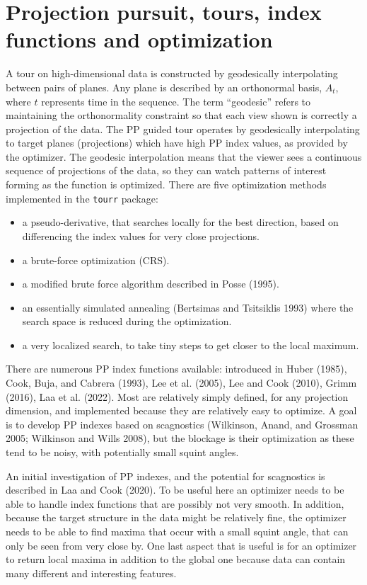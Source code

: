 \documentclass[
  12pt,
]{interact}
\providecommand{\tightlist}{%
  \setlength{\itemsep}{0pt}\setlength{\parskip}{0pt}}
\theoremstyle{plain}
\begin{document}
\section{Projection pursuit, tours, index functions and
optimization}\label{sec-background}

A tour on high-dimensional data is constructed by geodesically
interpolating between pairs of planes. Any plane is described by an
orthonormal basis, \(A_t\), where \(t\) represents time in the sequence.
The term ``geodesic'' refers to maintaining the orthonormality
constraint so that each view shown is correctly a projection of the
data. The PP guided tour operates by geodesically interpolating to
target planes (projections) which have high PP index values, as provided
by the optimizer. The geodesic interpolation means that the viewer sees
a continuous sequence of projections of the data, so they can watch
patterns of interest forming as the function is optimized. There are
five optimization methods implemented in the \texttt{tourr} package:

\begin{itemize}
\tightlist
\item
  a pseudo-derivative, that searches locally for the best direction,
  based on differencing the index values for very close projections.
\item
  a brute-force optimization (CRS).
\item
  a modified brute force algorithm described in Posse (1995).
\item
  an essentially simulated annealing (Bertsimas and Tsitsiklis 1993)
  where the search space is reduced during the optimization.
\item
  a very localized search, to take tiny steps to get closer to the local
  maximum.
\end{itemize}

There are numerous PP index functions available: introduced in Huber
(1985), Cook, Buja, and Cabrera (1993), Lee et al. (2005), Lee and Cook
(2010), Grimm (2016), Laa et al. (2022). Most are relatively simply
defined, for any projection dimension, and implemented because they are
relatively easy to optimize. A goal is to develop PP indexes based on
scagnostics (Wilkinson, Anand, and Grossman 2005; Wilkinson and Wills
2008), but the blockage is their optimization as these tend to be noisy,
with potentially small squint angles.

An initial investigation of PP indexes, and the potential for
scagnostics is described in Laa and Cook (2020). To be useful here an
optimizer needs to be able to handle index functions that are possibly
not very smooth. In addition, because the target structure in the data
might be relatively fine, the optimizer needs to be able to find maxima
that occur with a small squint angle, that can only be seen from very
close by. One last aspect that is useful is for an optimizer to return
local maxima in addition to the global one because data can contain many
different and interesting features.
\end{document}
